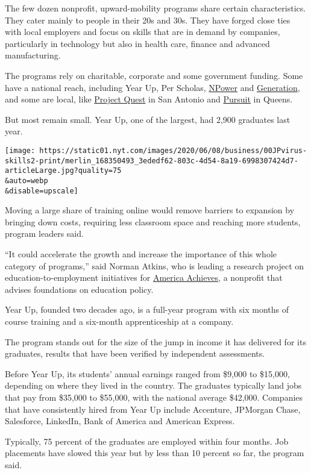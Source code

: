 The few dozen nonprofit, upward-mobility programs share certain
characteristics. They cater mainly to people in their 20s and 30s. They
have forged close ties with local employers and focus on skills that are
in demand by companies, particularly in technology but also in health
care, finance and advanced manufacturing.

The programs rely on charitable, corporate and some government funding.
Some have a national reach, including Year Up, Per Scholas,
\href{https://www.npower.org/}{NPower} and
\href{https://usa.generation.org/}{Generation}, and some are local, like
\href{https://questsa.org/}{Project Quest} in San Antonio and
\href{https://www.nytimes.com/2019/03/15/business/pursuit-tech-jobs-training.html}{Pursuit}
in Queens.

But most remain small. Year Up, one of the largest, had 2,900 graduates
last year.

\texttt{[image: https://static01.nyt.com/images/2020/06/08/business/00JPvirus-skills2-print/merlin\_168350493\_3ededf62-803c-4d54-8a19-6998307424d7-articleLarge.jpg?quality=75\\\&auto=webp\\\&disable=upscale]}

Moving a large share of training online would remove barriers to
expansion by bringing down costs, requiring less classroom space and
reaching more students, program leaders said.

``It could accelerate the growth and increase the importance of this
whole category of programs,'' said Norman Atkins, who is leading a
research project on education-to-employment initiatives for
\href{http://americaachieves.org/}{America Achieves}, a nonprofit that
advises foundations on education policy.

Year Up, founded two decades ago, is a full-year program with six months
of course training and a six-month apprenticeship at a company.

The program stands out for the size of the jump in income it has
delivered for its graduates, results that have been verified by
independent assessments.

Before Year Up, its students' annual earnings ranged from \$9,000 to
\$15,000, depending on where they lived in the country. The graduates
typically land jobs that pay from \$35,000 to \$55,000, with the
national average \$42,000. Companies that have consistently hired from
Year Up include Accenture, JPMorgan Chase, Salesforce, LinkedIn, Bank of
America and American Express.

Typically, 75 percent of the graduates are employed within four months.
Job placements have slowed this year but by less than 10 percent so far,
the program said.

